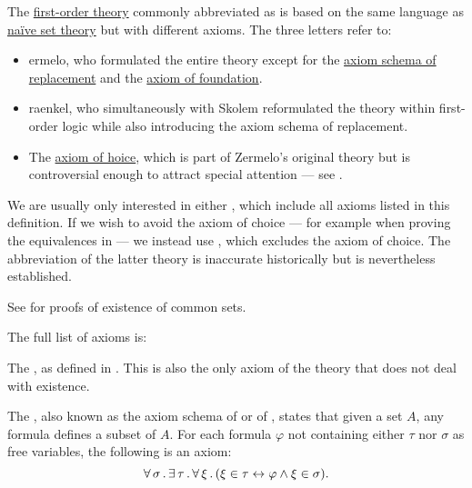 \begin{definition}\label{def:zfc}
  The \hyperref[def:first_order_theory]{first-order theory} commonly abbreviated as  is based on the same language as \hyperref[def:naive_set_theory]{na\"ive set theory} but with different axioms. The three letters refer to:
  \begin{itemize}
    \item {}ermelo, who formulated the entire theory except for the \hyperref[def:zfc/replacement]{axiom schema of replacement} and the \hyperref[def:zfc/foundation]{axiom of foundation}.
    \item{} raenkel, who simultaneously with Skolem reformulated the theory within first-order logic while also introducing the axiom schema of replacement.
    \item The \hyperref[def:zfc/choice]{axiom of hoice}, which is part of Zermelo's original theory but is controversial enough to attract special attention --- see .
  \end{itemize}

  We are usually only interested in either , which include all axioms listed in this definition. If we wish to avoid the axiom of choice --- for example when proving the equivalences in  --- we instead use , which excludes the axiom of choice. The abbreviation of the latter theory is inaccurate historically but is nevertheless established.

  See  for proofs of existence of common sets.

  The full list of axioms is:
  \begin{thmenum}
     The , as defined in . This is also the only axiom of the theory that does not deal with existence.

     The , also known as the axiom schema of  or of , states that given a set \( A \), any formula defines a subset of \( A \). For each formula \( \varphi \) not containing either \( \tau \) nor \( \sigma \) as free variables, the following is an axiom:
    \begin{equation}\label{eq:def:zfc/specification}
      \forall \thinspace \sigma \thinspace . \thinspace \exists \thinspace \tau \thinspace . \thinspace \forall \thinspace \xi \thinspace . \thinspace (\xi \in \tau \leftrightarrow \varphi \wedge \xi \in \sigma).
    \end{equation}


\end{thmenum}
\end{definition}
